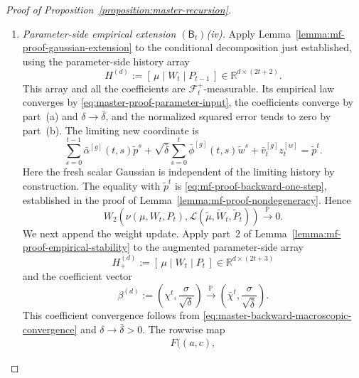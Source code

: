 \begin{proof}[Proof of Proposition~\ref{proposition:master-recursion}]
\begin{enumerate}[wide]
\begin{enumerate}[label=(\alph*),wide]
        \item \emph{Parameter-side empirical extension
        $(\mathsf B_t)$\textup{(iv)}.}
        Apply
        Lemma~\ref{lemma:mf-proof-gaussian-extension}
        to the conditional decomposition just established,
        using the parameter-side history array
        \[
            H^{(d)}
            :=
            [\,\mu\mid W_t\mid P_{t-1}\,]
            \in\mathbb R^{d\times(2t+2)}.
        \]
        This array and all the coefficients are
        $\mathcal F_t^+$-measurable.
        Its empirical law converges by
        \eqref{eq:master-proof-parameter-input},
        the coefficients converge by part~(a) and
        $\delta\to\bar\delta$, and the normalized squared
        error tends to zero by part~(b).
        The limiting new coordinate is
        \[
            \sum_{s=0}^{t-1}
                \bar\alpha^{[g]}(t,s)\tilde p^s
            +
            \sqrt{\bar\delta}
            \sum_{s=0}^{t}
                \bar\phi^{[g]}(t,s)\tilde w^s
            +
            \bar v_t^{[g]}z_t^{[w]}
            =
            \tilde p^t.
        \]
        Here the fresh scalar Gaussian is independent of
        the limiting history by construction.
        The equality with $\tilde p^t$ is
        \eqref{eq:mf-proof-backward-one-step}, established in the
        proof of Lemma~\ref{lemma:mf-proof-nondegeneracy}.
        Hence
        \begin{equation}
            W_2\left(
                \nu(\mu,W_t,P_t),
                \mathscr L(\tilde\mu,\tilde W_t,\tilde P_t)
            \right)
            \xrightarrow{\mathbb P}0.
            \label{eq:master-proof-backward-p-limit}
        \end{equation}
        We next append the weight update.
        Apply part~2 of
        Lemma~\ref{lemma:mf-proof-empirical-stability}
        to the augmented parameter-side array
        \[
            H^{(d)}_+
            :=
            [\,\mu\mid W_t\mid P_t\,]
            \in\mathbb R^{d\times(2t+3)}
        \]
        and the coefficient vector
        \[
            \beta^{(d)}
            :=
            \left(\chi^t,\frac{\sigma}{\sqrt\delta}\right)
            \xrightarrow{\mathbb P}
            \left(\bar\chi^t,\frac{\sigma}{\sqrt{\bar\delta}}\right).
        \]
        This coefficient convergence follows from
        \eqref{eq:master-backward-macroscopic-convergence}
        and $\delta\to\bar\delta>0$.
        The rowwise map
        \[
        \begin{aligned}
            F\bigl(
                (a,c),

\end{aligned}\]
\end{enumerate}
\end{enumerate}
\end{proof}
